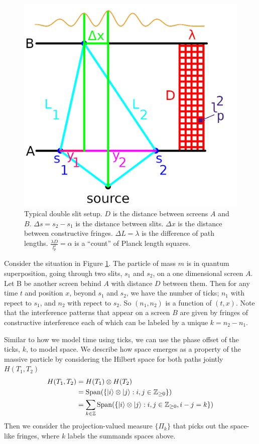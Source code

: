 \documentclass[12pt,a4paper]{article}
\begin{document}
\begin{figure}[h!]
\centering
\includegraphics[scale=0.5]{double_slit.png}
\caption{Typical double slit setup.  $D$ is the distance between screens $A$ and $B$. $\Delta s = s_2 - s_1$ is the distance between slits.  $\Delta x$ is the distance between constructive fringes. $\Delta L = \lambda$ is the difference of path lengths.  $\frac{\lambda D}{l_p^2} = \alpha$ is a ``count'' of Planck length squares.}
\label{screen}
\end{figure}


Consider the situation in Figure \ref{screen}.  The particle of mass $m$ is in quantum superposition, going through two slits, $s_1$ and $s_2$, on a one dimensional screen $A$. Let B be another screen behind $A$ with distance $D$ between them. Then for any time $t$ and position $x$, beyond $s_1$ and $s_2$, we have the number of ticks; $n_1$ with repect to $s_1$, and $n_2$ with repect to $s_2$. So $(n_1,n_2)$ is a function of $(t,x)$. Note that the interference patterns that appear on a screen $B$ are given by fringes of constructive interference each of which can be labeled by a unique $k = n_2 - n_1$.

Similar to how we model time using ticks, we can use the phase offset of the ticks, $k$, to model space. We describe how space emerges as a property of the massive particle by considering the Hilbert space for both paths jointly $H(T_1,T_2)$
\[
\begin{split}
  H(T_1,T_2) &= H(T_1) \otimes H(T_2) \\
  & = \mathrm{Span}(\{\ket{i} \otimes \ket{j}: i,j \in \mathbb{Z}_{\ge 0}\}) \\
  & = \sum_{k \in \mathbb{Z}} \mathrm{Span}(\{\ket{i} \otimes \ket{j} : i,j \in \mathbb{Z}_{\ge 0}, i-j = k\}) \\
\end{split}
\]
Then we consider the projection-valued measure $\{\Pi_k\}$ that picks out the space-like fringes, where $k$ labels the summands spaces above.
\end{document}
